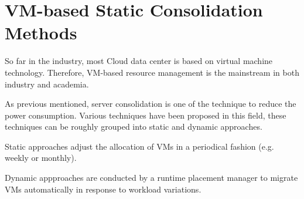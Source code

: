 \section{VM-based Static Consolidation Methods}

So far in the industry, most Cloud data center is based on virtual machine technology. Therefore, VM-based resource management is the mainstream in both industry and academia. 

As previous mentioned, server consolidation is one of the technique to reduce the power consumption. Various techniques have been proposed in this field, these techniques can be roughly grouped into static and dynamic approaches.

Static approaches adjust the allocation of VMs in a periodical fashion (e.g. weekly or monthly). 

Dynamic appproaches are conducted by a runtime placement manager to migrate VMs 
automatically in response to workload variations.









